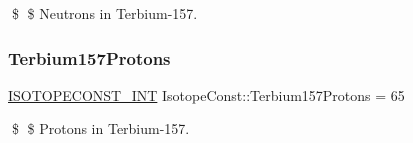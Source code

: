 \$ \$ Neutrons in Terbium-\/157. \mbox{\label{group___isotope_const-_terbium-_tb157_gaecf9312bb1c00d11797f0d87881f6bab}} 
\subsubsection{\texorpdfstring{Terbium157\+Protons}{Terbium157Protons}}
{\footnotesize\ttfamily \mbox{\hyperlink{group___isotope_const-_macros_ga5f18360b3e99483a35c32d789e62621c}{I\+S\+O\+T\+O\+P\+E\+C\+O\+N\+S\+T\+\_\+\+I\+NT}} Isotope\+Const\+::\+Terbium157\+Protons = 65}

\$ \$ Protons in Terbium-\/157. 
